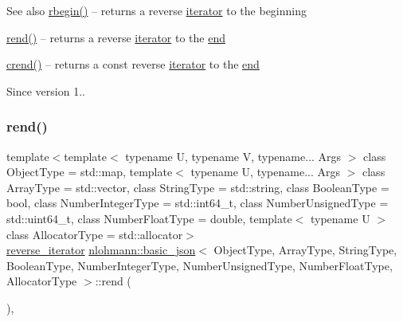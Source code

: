 \begin{DoxySeeAlso}{See also}
\hyperlink{classnlohmann_1_1basic__json_a62ccf5b9b3674aec2403fbc02da03db8}{rbegin()} -- returns a reverse \hyperlink{classnlohmann_1_1basic__json_1_1iterator}{iterator} to the beginning 

\hyperlink{classnlohmann_1_1basic__json_aaa160a960dd3dd90856a72b1d8dbe707}{rend()} -- returns a reverse \hyperlink{classnlohmann_1_1basic__json_1_1iterator}{iterator} to the \hyperlink{classnlohmann_1_1basic__json_a12ccf14d39ddae52f6c7e126105a230b}{end} 

\hyperlink{classnlohmann_1_1basic__json_aa7084e62b93ef0236698b246a58bb2da}{crend()} -- returns a const reverse \hyperlink{classnlohmann_1_1basic__json_1_1iterator}{iterator} to the \hyperlink{classnlohmann_1_1basic__json_a12ccf14d39ddae52f6c7e126105a230b}{end}
\end{DoxySeeAlso}
\begin{DoxySince}{Since}
version 1.. 
\end{DoxySince}
\hypertarget{classnlohmann_1_1basic__json_aaa160a960dd3dd90856a72b1d8dbe707}{}\label{classnlohmann_1_1basic__json_aaa160a960dd3dd90856a72b1d8dbe707} 
\subsubsection{\texorpdfstring{rend()}{rend()}\hspace{0.1cm}{\footnotesize\ttfamily [1/2]}}
{\footnotesize\ttfamily template$<$template$<$ typename U, typename V, typename... Args $>$ class Object\+Type = std\+::map, template$<$ typename U, typename... Args $>$ class Array\+Type = std\+::vector, class String\+Type  = std\+::string, class Boolean\+Type  = bool, class Number\+Integer\+Type  = std\+::int64\+\_\+t, class Number\+Unsigned\+Type  = std\+::uint64\+\_\+t, class Number\+Float\+Type  = double, template$<$ typename U $>$ class Allocator\+Type = std\+::allocator$>$ \\
\hyperlink{classnlohmann_1_1basic__json_a2f1f83aa187a56dc5ec7a7027065ac8a}{reverse\+\_\+iterator} \hyperlink{classnlohmann_1_1basic__json}{nlohmann\+::basic\+\_\+json}$<$ Object\+Type, Array\+Type, String\+Type, Boolean\+Type, Number\+Integer\+Type, Number\+Unsigned\+Type, Number\+Float\+Type, Allocator\+Type $>$\+::rend (\begin{DoxyParamCaption}{ }\end{DoxyParamCaption})\hspace{0.3cm}{\ttfamily [inline]}, {\ttfamily [noexcept]}}



